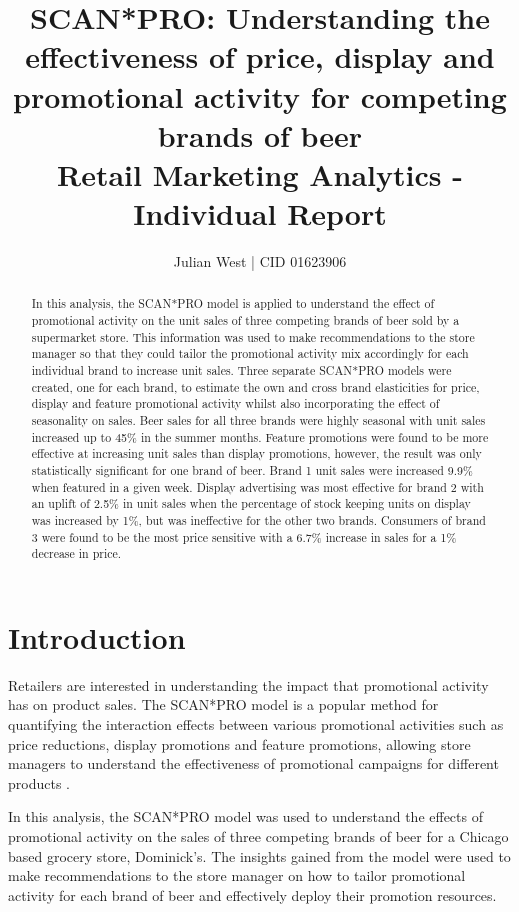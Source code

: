 \documentclass[a4paper,11pt]{article}
\title{SCAN*PRO: Understanding the effectiveness of price, display and promotional activity for competing brands of beer  \\
\addlinespace
\large Retail Marketing Analytics - Individual Report}
\author{Julian West | CID 01623906}
\begin{document}
\maketitle
\begin{abstract}
In this analysis, the SCAN*PRO model is applied to understand the effect of promotional activity on the unit sales of three competing brands of beer sold by a supermarket store. This information was used to make recommendations to the store manager so that they could tailor the promotional activity mix accordingly for each individual brand to increase unit sales. Three separate SCAN*PRO models were created, one for each brand, to estimate the own and cross brand elasticities for price, display and feature promotional activity whilst also incorporating the effect of seasonality on sales. Beer sales for all three brands were highly seasonal with unit sales increased up to 45\% in the summer months. Feature promotions were found to be more effective at increasing unit sales than display promotions, however, the result was only statistically significant for one brand of beer. Brand 1 unit sales were increased 9.9\% when featured in a given week. Display advertising was most effective for brand 2 with an uplift of 2.5\% in unit sales when the percentage of stock keeping units on display was increased by 1\%, but was ineffective for the other two brands. Consumers of brand 3 were found to be the most price sensitive with a 6.7\% increase in sales for a 1\% decrease in price. 

\end{abstract} \hspace{50pt}

\newpage
\tableofcontents
\newpage

\section{Introduction}
Retailers are interested in understanding the impact that promotional activity has on product sales. The SCAN*PRO model \citep{wittink_estimation_1988} is a popular method for quantifying the interaction effects between various promotional activities such as price reductions, display promotions and feature promotions, allowing store managers to understand the effectiveness of promotional campaigns for different products \citep{andrews_estimating_2008, srinivasan_promotions_2004}. 

In this analysis, the SCAN*PRO model was used to understand the effects of promotional activity on the sales of three competing brands of beer for a Chicago based grocery store, Dominick's. The insights gained from the model were used to make recommendations to the store manager on how to tailor promotional activity for each brand of beer and effectively deploy their promotion resources.
\end{document}

